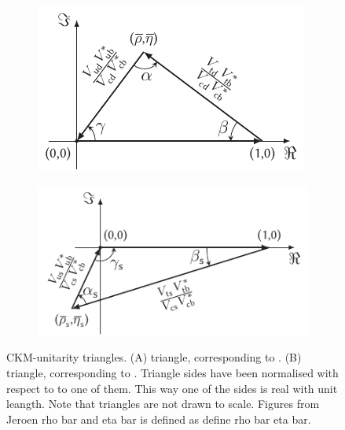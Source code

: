 \begin{figure}[h]
  \centering
  \begin{subfigure}{0.475\textwidth}
    \raggedright
    \includegraphics[width=\textwidth]{Figures/Chapter1/b-d-triangle}
    \caption{}
    \label{unitTriangles_bd}
  \end{subfigure}%
  \begin{subfigure}{0.525\textwidth}
    \raggedleft
    \includegraphics[width=\textwidth]{Figures/Chapter1/b-s-triangle}
    \caption{}
    \label{unitTriangles_bs}
  \end{subfigure}
  \caption{CKM-unitarity triangles. (A) \Bd triangle, corresponding to . (B) \Bs triangle,
           corresponding to . Triangle sides have been normalised with respect to to one of them.
           This way one of the sides is real with unit leangth. Note that triangles are not drawn to scale. Figures from {\color{red} Jeroen}
           rho bar and eta bar is defined as {\color{red} define rho bar eta bar}.  }
  \label{unitTriangles}
\end{figure}

